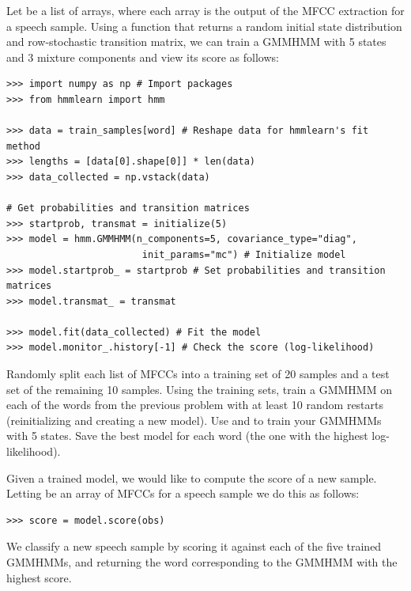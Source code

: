 Let  be a list of arrays, where each array is the output of the MFCC extraction for a speech sample.
Using a function  that returns a random initial state distribution and row-stochastic transition matrix, we can train a GMMHMM with 5 states and 3 mixture components and view its score as follows:

\begin{lstlisting}
>>> import numpy as np # Import packages 
>>> from hmmlearn import hmm

>>> data = train_samples[word] # Reshape data for hmmlearn's fit method
>>> lengths = [data[0].shape[0]] * len(data)
>>> data_collected = np.vstack(data)

# Get probabilities and transition matrices 
>>> startprob, transmat = initialize(5) 
>>> model = hmm.GMMHMM(n_components=5, covariance_type="diag", 
                        init_params="mc") # Initialize model
>>> model.startprob_ = startprob # Set probabilities and transition matrices 
>>> model.transmat_ = transmat

>>> model.fit(data_collected) # Fit the model
>>> model.monitor_.history[-1] # Check the score (log-likelihood)
\end{lstlisting}

\begin{problem}
Randomly split each list of MFCCs into a training set of 20 samples and a test set of the remaining 10 samples.
Using the training sets, train a GMMHMM on each of the words from the previous problem with at least 10 random restarts (reinitializing and creating a new model).
Use  and  to train your GMMHMMs with 5 states.  
Save the best model for each word (the one with the highest log-likelihood). 
\end{problem}

Given a trained model, we would like to compute the score of a new sample.
Letting  be an array of MFCCs for a speech sample we do this as follows:
\begin{lstlisting}
>>> score = model.score(obs)
\end{lstlisting}
We classify a new speech sample by scoring it against each of the five trained GMMHMMs, and returning the word corresponding to the GMMHMM with the highest score.


